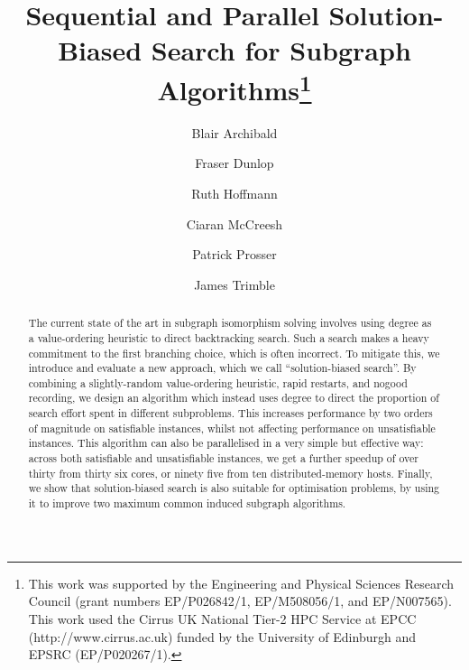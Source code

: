 \documentclass[runningheads]{llncs}
\begin{document}
\title{Sequential and Parallel Solution-Biased Search for Subgraph Algorithms\thanks{This work was
supported by the Engineering and Physical Sciences Research Council (grant numbers EP/P026842/1,
EP/M508056/1, and EP/N007565). This work used the Cirrus UK National Tier-2 HPC Service at EPCC
(http://www.cirrus.ac.uk) funded by the University of Edinburgh and EPSRC (EP/P020267/1).}}

\author{Blair Archibald\and
Fraser Dunlop\and
Ruth Hoffmann\and
Ciaran McCreesh\and
Patrick Prosser \and
James Trimble}



\maketitle

\begin{abstract}
    The current state of the art in subgraph isomorphism solving involves using degree as a
    value-ordering heuristic to direct backtracking search. Such a search makes a heavy commitment
    to the first branching choice, which is often incorrect. To mitigate this, we introduce and
    evaluate a new approach, which we call ``solution-biased search''. By combining a
    slightly-random value-ordering heuristic, rapid restarts, and nogood recording, we design an
    algorithm which instead uses degree to direct the proportion of search effort spent in different
    subproblems. This increases performance by two orders of magnitude on satisfiable instances,
    whilst not affecting performance on unsatisfiable instances. This algorithm can also be
    parallelised in a very simple but effective way: across both satisfiable and unsatisfiable
    instances, we get a further speedup of over thirty from thirty six cores, or ninety five from
    ten distributed-memory hosts. Finally, we show that solution-biased search is also suitable for
    optimisation problems, by using it to improve two maximum common induced subgraph algorithms.
\end{abstract}
\end{document}
